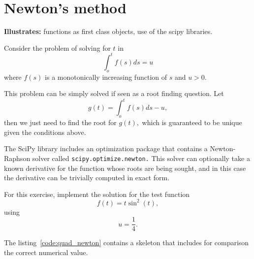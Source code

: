 \section{Newton's method}
\label{sec:quad_newton}

\textbf{Illustrates:} functions as first class objects, use of the
scipy libraries.

Consider the problem of solving for $t$ in
\begin{equation}
  \int_{o}^{t}f(s)ds=u
\end{equation} 
where $f(s)$ is a monotonically increasing function of $s$ and $u>0$.

This problem can be simply solved if seen as a root finding question. Let
\begin{equation}
g(t)=\int_{o}^{t}f(s)ds-u,
\end{equation}
then we just need to find the root for $g(t),$ which is guaranteed
to be unique given the conditions above. 

The SciPy library includes an optimization package that contains a
Newton-Raphson solver called \texttt{scipy.optimize.newton.} This
solver can optionally take a known derivative for the function whose
roots are being sought, and in this case the derivative can be trivially
computed in exact form.

For this exercise, implement the solution for the test function 
\[
f(t)=t\sin^{2}(t), 
\]
using 
\[ 
u=\frac{1}{4}. 
\]

The listing~\ref{code:quad_newton} contains a skeleton that
includes for comparison the correct numerical value.


